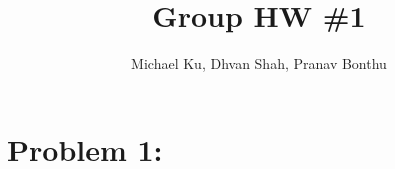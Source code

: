 \documentclass[11pt]{article}
\begin{document}
\title{Group HW \#1}
\author{Michael Ku, Dhvan Shah, Pranav Bonthu}
\maketitle

\section*{Problem 1:}


% 

% 

% 

% 
\end{document}

